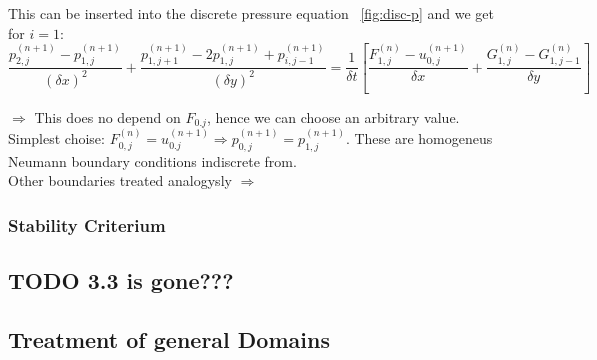 This can be inserted into the discrete pressure equation ~\ref{fig:disc-p} and we get for $i = 1$:
\[ \frac{p_{2,j}^{(n+1)} - p_{1,j}^{(n+1)}}{(\delta x)^2} + \frac{p_{1,j+1}^{(n+1)} - 2 p_{1,j}^{(n+1)} + p_{i,j-1}^{(n+1)}}{(\delta y)^2} = \frac{1}{\delta t} \left[ \frac{F_{1,j}^{(n)} - u_{0,j}^{(n+1)}}{\delta x} + \frac{G_{1,j}^{(n)} - G_{1,j-1}^{(n)}}{\delta y}\right] \]

$\Rightarrow$ This does no depend on $F_{0.j}$, hence we can choose an arbitrary value. Simplest choise: $F_{0,j}^{(n)} = u_{0.j}^{(n+1)} \Rightarrow p_{0,j}^{(n+1)} = p_{1,j}^{(n+1)}$. These are homogeneus Neumann boundary conditions indiscrete from.\\

Other boundaries treated analogysly $\Rightarrow$



\subsubsection{Stability Criterium}



\subsection{TODO 3.3 is gone???}






\subsection{Treatment of general Domains}

